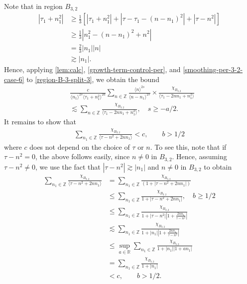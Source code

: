 \documentclass[12pt,reqno]{amsart}
\numberwithin{equation}{section}  %
\numberwithin{figure}{section}
\newcommand{\rr}{\mathbb{R}}
\newcommand{\zz}{\mathbb{Z}}
\theoremstyle{plain}
\theoremstyle{definition}
\theoremstyle{remark}
\begin{document}
%
Note that in region $B_{3,2}$
\begin{equation}
  \label{smoothing-per-3-2-case-6}
\begin{split}
  | \tau_{1} + n_{1}^{2} |
  & \ge \frac{1}{3}\left[ | \tau_{1} + n_{1}^{2} | + | \tau -
  \tau_{1} - (n - n_{1})^{2}
  | + | \tau - n^{2} | \right]
  \\
  & \ge \frac{1}{3} |  n_{1}^{2} - (n - n_{1})^{2} + n^{2} |
  \\
  & = \frac{2}{3} | n_{1} | | n |
  \\
  & \gtrsim | n_{1} |.
\end{split}
\end{equation}
%
Hence, applying
\autoref{lem:calc}, \eqref{growth-term-control-per}, and
\eqref{smoothing-per-3-2-case-6} to \eqref{region-B-3-split-3}, we obtain the bound
%
%
\begin{equation*}
  \begin{split}
    &  \frac{c}{\langle n_{1} \rangle ^{2s}
    \langle \tau_{1} + n_{1}^{2} \rangle
    ^{2a}} \sum_{n \in \zz} \frac{\langle n \rangle ^{2s}}{\langle
    n - n_{1}\rangle ^{2s}}  \times \frac{\chi_{B_{3,2}}}{\langle
    \tau_{1} - 2nn_{1} + n_{1}^{2} \rangle } 
    \\
    & \lesssim 
    \sum_{n \in \zz} \frac{\chi_{B_{3,2}}}{\langle
    \tau_{1} - 2nn_{1} + n_{1}^{2} \rangle },
    \quad s \ge -a/2.
  \end{split}
\end{equation*}
%
%
%
It remains to show that 
%
%
%
\begin{equation}
  \label{sum-bound}
\begin{split}
\sum_{n_{1} \in
\zz} \frac{\chi_{B_{3,2}}}{\langle \tau - n^{2} + 2nn_{1}
\rangle } < c, \qquad b > 1/2
\end{split}
\end{equation}
%
%
where $c$ does not depend on the choice of $\tau$ or $n$. 
%
%
To see this, note that if $\tau - n^{2} = 0$, the above follows easily, since
$n \neq 0$ in $B_{3,2}$.
Hence, assuming $\tau - n^{2} \neq 0$, we use the fact that $| \tau - n^{2} |
\gtrsim | n_{1} |$ and $n \neq 0$ in $B_{3,2}$ to obtain 
%
%
\begin{equation*}
\begin{split}
\sum_{n_{1} \in
\zz} \frac{\chi_{B_{3,2}}}{\langle \tau - n^{2} + 2nn_{1}
\rangle }
& = \sum_{n_{1} \in \zz} \frac{\chi_{B_{3,2}}}{(1 + | \tau - n^{2} +
2nn_{1} |)}
\\
& \le \sum_{n_{1} \in \zz} \frac{\chi_{B_{3,2}}}{1 + | \tau - n^{2} +
2nn_{1} |}, \quad b \ge 1/2
\\
& \le \sum_{n_{1} \in \zz} \frac{\chi_{B_{3,2}}}{1 + | \tau - n^{2}
| | 1 + \frac{2nn_{1}}{\tau - n^{2}} |}
\\
& \lesssim \sum_{n_{1} \in \zz} \frac{\chi_{B_{3,2}}}{1 + |n_{1}|
| 1 + \frac{2nn_{1}}{\tau - n^{2}} |}
\\
& \le \sup_{a \in \rr} \sum_{n_{1} \in \zz} \frac{\chi_{B_{3,2}}}{1 + |n_{1}|
| 1 + an_{1}| }
\\
& = \sum_{n_{1} \in \zz} \frac{\chi_{B_{3,2}}}{1 + |n_{1}|}
\\
& < c, \qquad b > 1/2.
\end{split}
\end{equation*}
\end{document}
